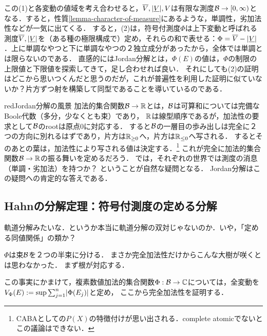 \documentclass[uplatex, dvipdfmx]{jsreport}
\begin{document}
\begin{remarks}[普遍性を用いた証明？]
    この(1)と各変動の値域を考え合わせると，$\overline{V},\lvert\underline{V}\rvert,V$は有限な測度$\mathcal{B}\to[0,\infty)$となる．すると，性質\ref{lemma-character-of-measure}にあるような，単調性，劣加法性などが一気に出てくる．
    すると，(2)は，符号付測度$\Phi$は上下変動と呼ばれる測度$\overline{V},\lvert\underline{V}\rvert$を（ある種の極限構成で）定め，それらの和で表せる：$\Phi=\overline{V}-\lvert\underline{V}\rvert$．上に単調なやつと下に単調なやつの２独立成分があったから，全体では単調とは限らないのである．
    直感的にはJordan分解とは，$\Phi(E)$の値は，$\Phi$の制限の上限値と下限値を探索してきて，足し合わせれば良い．
    それにしても(2)の証明はどこから思いつくんだと思うのだが，これが普遍性を利用した証明に似ていないか？片方ずつ射を構築して同型であることを導いているのである．
\end{remarks}

\begin{tbox}{red}{Jordan分解の風景}
    加法的集合関数$\mathcal{B}\to\mathbb{R}$とは，$\mathcal{B}$は可算和については完備なBoole代数（多分，少なくとも束）であり，
    $\mathbb{R}$は線型順序であるが，加法性の要求として$\mathcal{B}$のrootは原点$0$に対応する．
    すると$\mathcal{B}$の一層目の歩み出しは完全に２つの方向に別れるはずであり，片方は$\mathbb{R}_{\ge 0}$へ，片方は$\mathbb{R}_{\le 0}$へ写される．
    するとそのあとの葉は，加法性により写される値は決定する．\footnote{CABAとしての$P(X)$の特徴付けが思い出される．complete atomicでないとこの議論はできない．}
    これが完全に加法的集合関数$\mathcal{B}\to\mathbb{R}$の振る舞いを定めるだろう．
    では，それぞれの世界では測度の消息（単調・劣加法）を持つか？
    ということが自然な疑問となる．
    Jordan分解はこの疑問への肯定的な答えである．
\end{tbox}

\subsection{Hahnの分解定理：符号付測度の定める分解}

\begin{tcolorbox}[colframe=ForestGreen, colback=ForestGreen!10!white,breakable,colbacktitle=ForestGreen!40!white,coltitle=black,fonttitle=\bfseries\sffamily,
title=]
    軌道分解みたいな．というか本当に軌道分解の双対じゃないのか．いや，「定める同値関係」の類か？
    
    $\Phi$は束$\mathcal{B}$を２つの半束に分ける．
    まさか完全加法性だけからこんな大樹が咲くとは思わなかった．
    まず根が対応する．

    この事実にかまけて，複素数値加法的集合関数$\Phi:\mathcal{B}\to\mathbb{C}$については，全変動を$V_\Phi(E):=\sup\sum^n_{j=1}\lvert\Phi(E_j)\rvert$と定め，
    ここから完全加法性を証明する．
\end{tcolorbox}
\end{document}
